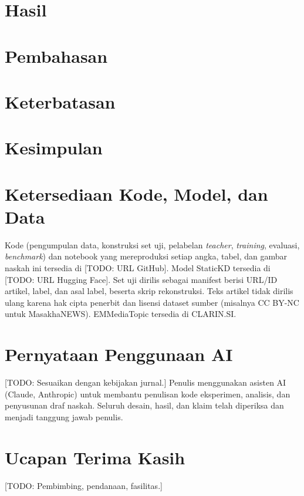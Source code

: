 \documentclass[journal]{IEEEtran}
\DeclareRobustCommand{\todo}[1]{{\color{red}[TODO: #1]}}
\newcommand{\eng}[1]{\textit{#1}}   %
\begin{document}
\section{Hasil}
\label{sec:results}


\section{Pembahasan}
\label{sec:discussion}


\section{Keterbatasan}
\label{sec:limitations}


\section{Kesimpulan}
\label{sec:conclusion}


\section*{Ketersediaan Kode, Model, dan Data}
Kode (pengumpulan data, konstruksi set uji, pelabelan \eng{teacher}, \eng{training}, evaluasi, \eng{benchmark}) dan notebook yang mereproduksi setiap angka, tabel, dan gambar naskah ini tersedia di \todo{URL GitHub}. Model StaticKD tersedia di \todo{URL Hugging Face}. Set uji dirilis sebagai manifest berisi URL/ID artikel, label, dan asal label, beserta skrip rekonstruksi. Teks artikel tidak dirilis ulang karena hak cipta penerbit dan lisensi dataset sumber (misalnya CC BY-NC untuk MasakhaNEWS). EMMediaTopic tersedia di CLARIN.SI.

\section*{Pernyataan Penggunaan AI}
\todo{Sesuaikan dengan kebijakan jurnal.} Penulis menggunakan asisten AI (Claude, Anthropic) untuk membantu penulisan kode eksperimen, analisis, dan penyusunan draf naskah. Seluruh desain, hasil, dan klaim telah diperiksa dan menjadi tanggung jawab penulis.

\section*{Ucapan Terima Kasih}
\todo{Pembimbing, pendanaan, fasilitas.}



\end{document}
